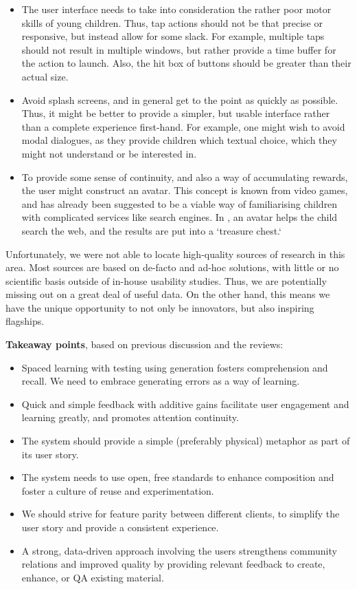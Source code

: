\begin{itemize}
\item The user interface needs to take into consideration the rather poor motor
skills of young children.\cite{kidsquora} Thus, tap actions should not be that
precise or responsive, but instead allow for some slack. For example, multiple
taps should not result in multiple windows, but rather provide a time buffer for
the action to launch. Also, the hit box of buttons should be greater than their
actual size.
\item Avoid splash screens,\cite{kidsluke} and in general get to the point as quickly as
possible. Thus, it might be better to provide a simpler, but usable interface
rather than a complete experience first-hand. For example, one might wish to
avoid modal dialogues, as they provide children which textual choice, which they
might not understand or be interested in.
\item To provide some sense of continuity, and also a way of accumulating
rewards, the user might construct an avatar. This concept is known from video
games, and has already been suggested to be a viable way of familiarising
children with complicated services like search engines.
In \cite{gossen2012search}, an avatar helps the child search the web, and the
results are put into a `treasure chest.`
\end{itemize}

Unfortunately, we were not able to locate high-quality sources of research in
this area. Most sources are based on de-facto and ad-hoc solutions, with little
or no scientific basis outside of in-house usability studies. Thus, we are
potentially missing out on a great deal of useful data. On the other hand, 
this means we have the unique opportunity to not only be innovators, but also 
inspiring flagships.

\textbf{Takeaway points}, based on previous discussion and the reviews:

\begin{itemize}
\item Spaced learning with testing using generation fosters comprehension and
recall. We need to embrace generating errors as a way of learning.
\item Quick and simple feedback with additive gains facilitate user engagement
and learning greatly, and promotes attention continuity.
\item The system should provide a simple (preferably physical) metaphor as part
of its user story.
\item The system needs to use open, free standards to enhance composition and
foster a culture of reuse and experimentation.
\item We should strive for feature parity between different clients, to simplify
the user story and provide a consistent experience.
\item A strong, data-driven approach involving the users strengthens community
relations and improved quality by providing relevant feedback to create,
enhance, or QA existing material.
\end{itemize}

